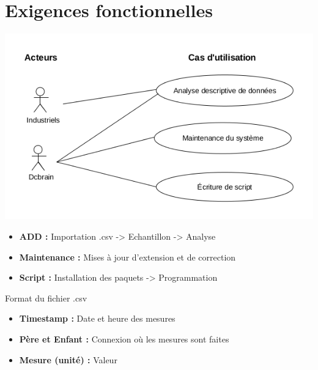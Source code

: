 	\section{Exigences fonctionnelles}
	\begin{frame}
		\begin{center}\includegraphics[scale=0.43]{../Cahier/diagCU.png}\end{center} \pause
		\begin{itemize}
			\item \textbf{ADD :} Importation .csv -> Echantillon -> Analyse
			\item \textbf{Maintenance :} Mises à jour d'extension et de correction
			\item \textbf{Script :} Installation des paquets -> Programmation
		\end{itemize} \pause
		
		Format du fichier .csv\\
		\begin{itemize}
			\item \textbf{Timestamp :} Date et heure des mesures
			\item \textbf{Père et Enfant :} Connexion où les mesures sont faites
			\item \textbf{Mesure (unité) :} Valeur
		\end{itemize}
	\end{frame}
	
